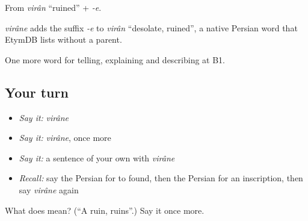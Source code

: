 From \emph{virân} \textquotedblleft{}ruined\textquotedblright{} + \emph{-e}.

\begin{cousinweb}
\emph{virâne} adds the suffix \emph{-e} to \emph{virân} \textquotedblleft{}desolate, ruined\textquotedblright{}, a native Persian word that EtymDB lists without a parent.
\end{cousinweb}

\begin{grammarlens}[title={What you've built}]
One more word for telling, explaining and describing at B1.
\end{grammarlens}

\subsection*{Your turn}
\begin{itemize}
\raggedright
  \item \emph{Say it:} \emph{virâne}
  \item \emph{Say it:} \emph{virâne}, once more
  \item \emph{Say it:} a sentence of your own with \emph{virâne}
  \item \emph{Recall:} say the Persian for to found, then the Persian for an inscription, then say \emph{virâne} again
\end{itemize}

\begin{tcolorbox}[breakable,colback=teal!4,colframe=teal!35!black,title={Before you move on}]
What does  mean? (\textquotedblleft{}A ruin, ruins\textquotedblright{}.) Say it once more.
\end{tcolorbox}
